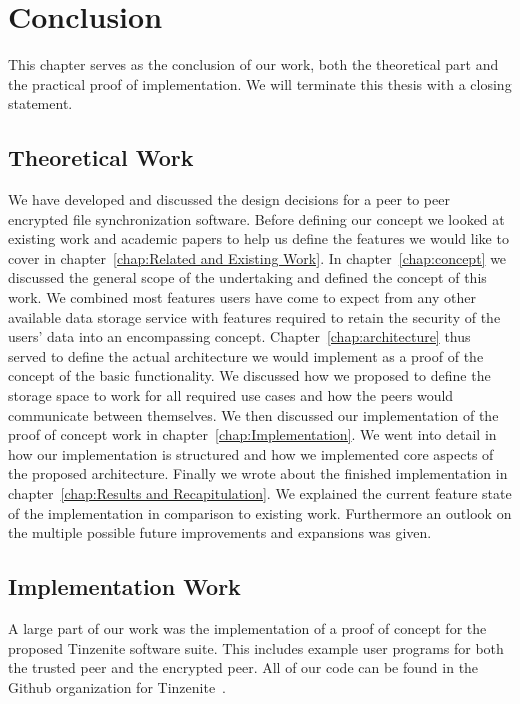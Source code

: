 \chapter{Conclusion}
\label{chap:conclusion}

This chapter serves as the conclusion of our work, both the theoretical part and the practical proof of implementation.
We will terminate this thesis with a closing statement.

\section{Theoretical Work}
\label{sec:Theoretical Work}

We have developed and discussed the design decisions for a peer to peer encrypted file synchronization software.
Before defining our concept we looked at existing work and academic papers to help us define the features we would like to cover in chapter~\ref{chap:Related and Existing Work}.
In chapter~\ref{chap:concept} we discussed the general scope of the undertaking and defined the concept of this work.
We combined most features users have come to expect from any other available data storage service with features required to retain the security of the users' data into an encompassing concept.
Chapter~\ref{chap:architecture} thus served to define the actual architecture we would implement as a proof of the concept of the basic functionality.
We discussed how we proposed to define the storage space to work for all required use cases and how the peers would communicate between themselves.
We then discussed our implementation of the proof of concept work in chapter~\ref{chap:Implementation}.
We went into detail in how our implementation is structured and how we implemented core aspects of the proposed architecture.
Finally we wrote about the finished implementation in chapter~\ref{chap:Results and Recapitulation}.
We explained the current feature state of the implementation in comparison to existing work.
Furthermore an outlook on the multiple possible future improvements and expansions was given.

\section{Implementation Work}
\label{sec:Implementation Work}

A large part of our work was the implementation of a proof of concept for the proposed Tinzenite software suite.
This includes example user programs for both the trusted peer and the encrypted peer.
All of our code can be found in the Github organization for Tinzenite~\cite{web:site:github:tinzenite}.

